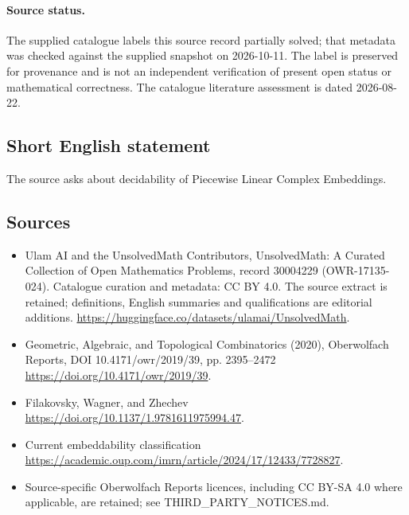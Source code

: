 \documentclass[11pt]{article}
\begin{document}
\paragraph{Source status.}
The supplied catalogue labels this source record partially solved; that metadata was checked against the supplied snapshot on 2026-10-11. The label is preserved for provenance and is not an independent verification of present open status or mathematical correctness. The catalogue literature assessment is dated 2026-08-22.
\subsection{Short English statement}
The source asks about decidability of Piecewise Linear Complex Embeddings.
\subsection{Sources}
\begin{itemize}
\item[\hypertarget{source:30004229:1}{S1}] Ulam AI and the UnsolvedMath Contributors, UnsolvedMath: A Curated Collection of Open Mathematics Problems, record 30004229 (OWR-17135-024). Catalogue curation and metadata: CC BY 4.0. The source extract is retained; definitions, English summaries and qualifications are editorial additions.
\url{https://huggingface.co/datasets/ulamai/UnsolvedMath}.
\item[\hypertarget{source:30004229:2}{S2}] Geometric, Algebraic, and Topological Combinatorics (2020), Oberwolfach Reports, DOI 10.4171/owr/2019/39, pp. 2395--2472
\url{https://doi.org/10.4171/owr/2019/39}.
\item[\hypertarget{source:30004229:3}{S3}] Filakovsky, Wagner, and Zhechev
\url{https://doi.org/10.1137/1.9781611975994.47}.
\item[\hypertarget{source:30004229:4}{S4}] Current embeddability classification
\url{https://academic.oup.com/imrn/article/2024/17/12433/7728827}.
\item Source-specific Oberwolfach Reports licences, including CC BY-SA 4.0 where applicable, are retained; see THIRD\_PARTY\_NOTICES.md.
\end{itemize}
\end{document}
